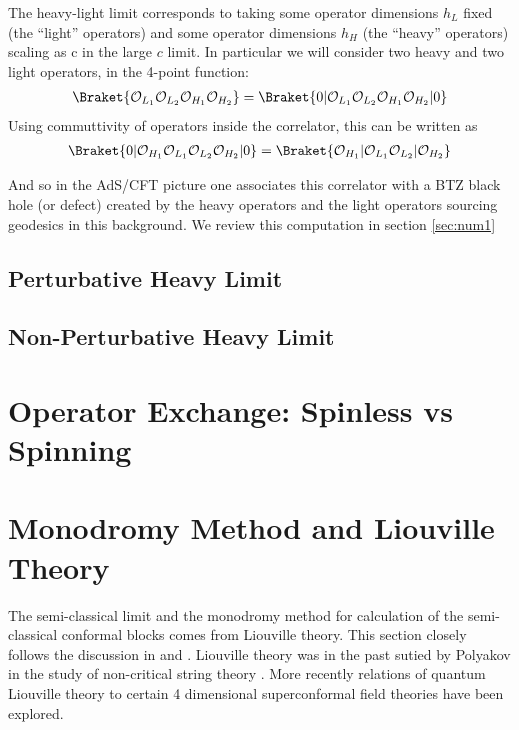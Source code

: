   The heavy-light limit corresponds to taking some operator dimensions $h_L$ fixed (the ``light'' operators) and some operator dimensions $h_H$ (the ``heavy'' operators) scaling as c in the large $c$ limit. In particular we will consider two heavy and two light operators, in the 4-point function:
  \begin{align}
   \Braket{\mathcal{O}_{L_1}\mathcal{O}_{L_2}\mathcal{O}_{H_1}\mathcal{O}_{H_2}} = \Braket{0|\mathcal{O}_{L_1}\mathcal{O}_{L_2}\mathcal{O}_{H_1}\mathcal{O}_{H_2}|0} 
  \end{align}
  Using commuttivity of operators inside the correlator, this can be written as 
   \begin{align}
   \Braket{0|\mathcal{O}_{H_1}\mathcal{O}_{L_1}\mathcal{O}_{L_2}\mathcal{O}_{H_2}|0} = \Braket{\mathcal{O}_{H_1}|\mathcal{O}_{L_1}\mathcal{O}_{L_2}|\mathcal{O}_{H_2}} 
  \end{align}
  
  And so in the AdS/CFT picture one associates this correlator with a BTZ black hole (or defect) created by the heavy operators and the light operators sourcing geodesics in this background. We review this computation in section \ref{sec:num1}
  \subsection{Perturbative Heavy Limit}
  \subsection{Non-Perturbative Heavy Limit}
  \section{Operator Exchange: Spinless vs Spinning}
  \section{Monodromy Method and Liouville Theory}
  
  The semi-classical limit and the monodromy method for calculation of the semi-classical conformal blocks comes from Liouville theory. This section closely follows the discussion in \cite{Harlow:2011ny} and \cite{Fitzpatrick:2014vua}. Liouville theory was in the past sutied by Polyakov in the study of non-critical string theory \cite{Polyakov:1981rd}. More recently relations of quantum Liouville theory to 
certain 4 dimensional superconformal field theories have been explored\cite{Alday:2009aq}.

